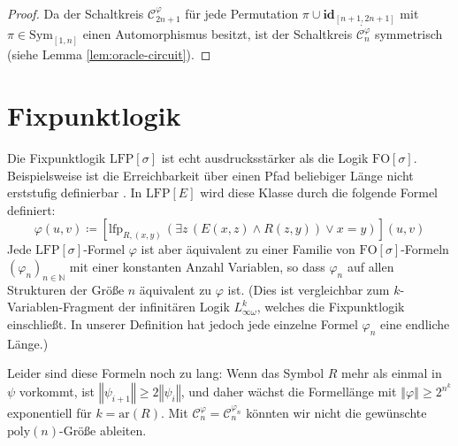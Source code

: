 \begin{proof}
Da der Schaltkreis $\mathcal{C}_{2n+1}^{\varphi}$ für jede Permutation
$\pi\cup\mathbf{id}_{\left[n+1,2n+1\right]}$ mit $\pi\in\mathrm{Sym}_{\left[1,n\right]}$
einen Automorphismus besitzt, ist der Schaltkreis $\dot{\mathcal{C}_{n}^{\varphi}}$
symmetrisch (siehe Lemma \ref{lem:oracle-circuit}).
\end{proof}

\section{Fixpunktlogik}

Die Fixpunktlogik $\mathrm{LFP}\left[\sigma\right]$ ist echt ausdrucksstärker
als die Logik $\mathrm{FO}\left[\sigma\right]$. Beispielsweise ist
die Erreichbarkeit über einen Pfad beliebiger Länge nicht erststufig
definierbar \cite{Immerman1982,Libkin2012}. In $\mathrm{LFP}\left[E\right]$
wird diese Klasse durch die folgende Formel definiert:
\[
\varphi\left(u,v\right)\coloneqq\left[\mathrm{lfp}_{R,\left(x,y\right)}\,\left(\exists z\,\left(E\left(x,z\right)\wedge R\left(z,y\right)\right)\vee x=y\right)\right]\left(u,v\right)
\]
Jede $\mathrm{LFP}\left[\sigma\right]$-Formel $\varphi$ ist aber
äquivalent zu einer Familie von $\mathrm{FO}\left[\sigma\right]$-Formeln
$\left(\varphi_{n}\right)_{n\in\mathbb{N}}$ mit einer konstanten
Anzahl Variablen, so dass $\varphi_{n}$ auf allen Strukturen der
Größe $n$ äquivalent zu $\varphi$ ist. (Dies ist vergleichbar zum
$k$-Variablen-Fragment der infinitären Logik $L_{\infty\omega}^{k}$,
welches die Fixpunktlogik einschließt\cite{Dawar1995c,Kolaitis1992,Kolaitis1992b}.
In unserer Definition hat jedoch jede einzelne Formel $\varphi_{n}$
eine endliche Länge.)

Leider sind diese Formeln noch zu lang: Wenn das Symbol $R$ mehr
als einmal in $\psi$ vorkommt, ist $\left\Vert \psi_{i+1}\right\Vert \geqslant2\left\Vert \psi_{i}\right\Vert $,
und daher wächst die Formellänge mit $\left\Vert \varphi\right\Vert \geqslant2^{n^{k}}$
exponentiell für $k=\mathrm{ar}\left(R\right)$. Mit $\mathcal{C}_{n}^{\varphi}=\mathcal{C}_{n}^{\varphi_{n}}$
könnten wir nicht die gewünschte $\mathrm{poly}\left(n\right)$-Größe
ableiten.

